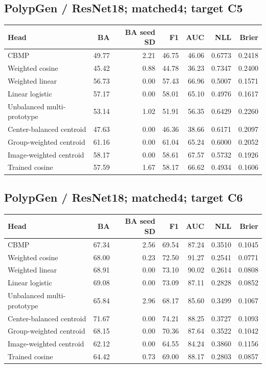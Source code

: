 \subsection*{PolypGen / ResNet18; matched4; target C5}
\begingroup\small\setlength{\tabcolsep}{3pt}
\begin{longtable}{lrrrrrr}
\toprule Head & BA & BA seed SD & F1 & AUC & NLL & Brier \\
\midrule
CBMP & 49.77 & 2.21 & 46.75 & 46.06 & 0.6773 & 0.2418 \\
Weighted cosine & 45.42 & 0.88 & 44.78 & 36.23 & 0.7347 & 0.2400 \\
Weighted linear & 56.73 & 0.00 & 57.43 & 66.96 & 0.5007 & 0.1571 \\
Linear logistic & 57.17 & 0.00 & 58.01 & 65.10 & 0.4976 & 0.1617 \\
Unbalanced multi-prototype & 53.14 & 1.02 & 51.91 & 56.35 & 0.6429 & 0.2260 \\
Center-balanced centroid & 47.63 & 0.00 & 46.36 & 38.66 & 0.6171 & 0.2097 \\
Group-weighted centroid & 61.16 & 0.00 & 61.04 & 65.24 & 0.6000 & 0.2052 \\
Image-weighted centroid & 58.17 & 0.00 & 58.61 & 67.57 & 0.5732 & 0.1926 \\
Trained cosine & 57.59 & 1.67 & 58.17 & 66.62 & 0.4934 & 0.1606 \\
\bottomrule
\end{longtable}
\endgroup
\subsection*{PolypGen / ResNet18; matched4; target C6}
\begingroup\small\setlength{\tabcolsep}{3pt}
\begin{longtable}{lrrrrrr}
\toprule Head & BA & BA seed SD & F1 & AUC & NLL & Brier \\
\midrule
CBMP & 67.34 & 2.56 & 69.54 & 87.24 & 0.3510 & 0.1045 \\
Weighted cosine & 68.00 & 0.23 & 72.50 & 91.27 & 0.2541 & 0.0771 \\
Weighted linear & 68.91 & 0.00 & 73.10 & 90.02 & 0.2614 & 0.0808 \\
Linear logistic & 69.08 & 0.00 & 73.09 & 87.11 & 0.2828 & 0.0852 \\
Unbalanced multi-prototype & 65.84 & 2.96 & 68.17 & 85.60 & 0.3499 & 0.1067 \\
Center-balanced centroid & 71.67 & 0.00 & 74.21 & 88.25 & 0.3727 & 0.1093 \\
Group-weighted centroid & 68.15 & 0.00 & 70.36 & 87.64 & 0.3522 & 0.1042 \\
Image-weighted centroid & 62.12 & 0.00 & 64.55 & 84.24 & 0.3860 & 0.1156 \\
Trained cosine & 64.42 & 0.73 & 69.00 & 88.17 & 0.2803 & 0.0857 \\
\bottomrule
\end{longtable}
\endgroup
